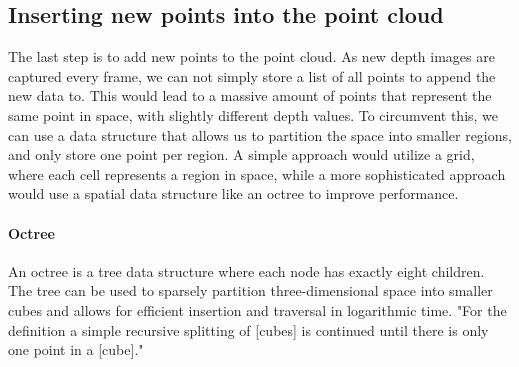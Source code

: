 

\subsection{Inserting new points into the point cloud}

The last step is to add new points to the point cloud.
As new depth images are captured every frame, we can not simply store a list of all points to append the new data to.
This would lead to a massive amount of points that represent the same point in space, with slightly different depth values.
To circumvent this, we can use a data structure that allows us to partition the space into smaller regions, and only store one point per region.
A simple approach would utilize a grid, where each cell represents a region in space, while a more sophisticated approach
would use a spatial data structure like an octree to improve performance.

\paragraph{Octree}
An octree is a tree data structure where each node has exactly eight children.
The tree can be used to sparsely partition three-dimensional space into smaller cubes and allows for efficient
insertion and traversal in logarithmic time.
"For the definition a simple recursive splitting of [cubes] is continued until there is only one point in a [cube]."
\parencite{gabriel_zachmann_geometric_2002}

